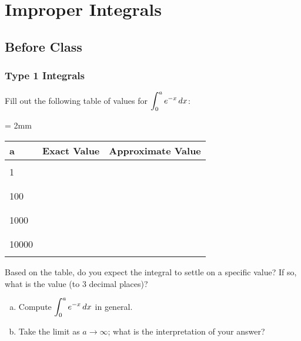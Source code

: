 \documentclass[notes]{subfiles}
\begin{document}
	\setcounter{section}{8}
	\setcounter{ex}{0}
	\fancyhead[LO,RE]{\bfseries \small \currentname}
	\fancyfoot[C]{{}}
	\fancyfoot[RO,LE]{\large \thepage}	%
	
\section*{Improper Integrals}\label{cs78}
	\subsection*{Before Class}
	\subsubsection*{Type 1 Integrals}
		\begin{ex}
			Fill out the following table of values for $\displaystyle \int_0^a e^{-x}\, dx$:
			\begin{center}
				\tabulinesep = 2mm
				\begin{tabu} to .9\textwidth {| X[.25,c] | X[.5,c] | X[c] |} \hline
					\textbf{a} & \textbf{Exact Value}	& \textbf{Approximate Value}\\ \hline
							& & \\
						1	& & \\ 
							& & \\ \hline
							& & \\ 
						100	& & \\ 
							& & \\ \hline
							& & \\
						1000	& & \\ 
							& & \\ \hline
							& & \\
						10000	& & \\
							& & \\ \hline
				\end{tabu}
			\end{center}
			Based on the table, do you expect the integral to settle on a specific value?  If so, what is the value (to 3 decimal places)?
		\end{ex}
			\vs{.5}
			
		\begin{ex}
			\begin{enumerate}[(a)]
				\item Compute $\displaystyle \int_0^a e^{-x}\, dx$ in general.
					\vs{1}
					
				\item Take the limit as $a\to \infty$; what is the interpretation of your answer?
					\vs{1}
			\end{enumerate}
		\end{ex}
			\newpage
		
\end{document}
